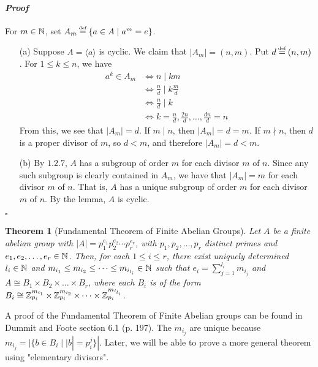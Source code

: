 \documentclass[11pt]{book}
\newcounter{counter}
\newtheorem{theorem}[counter]{Theorem}   \newtheorem*{theorem*}{Theorem}   \newtheorem{lemma}[counter]{Lemma}   \newtheorem{corollary}[counter]{Corollary}
\theoremstyle{definition}   \newtheorem{defn}[counter]{Definition} %
\newcommand\myeq{\mathrel{\overset{\makebox[0pt]{\mbox{\normalfont\tiny\sffamily \textrm{def}}}}{=}}}
\newcommand{\pf}[1]{$ #1 = p_1^{e_1} p_2^{e_2} \cdots p_r^{e_r}$, with $p_1,p_2,\dots,p_r$ distinct primes and $e_1,e_2,\dots,e_r\in \N$}
\newcommand{\gen}[1]{\langle #1 \rangle}   \newcommand{\stab}[2]{\tn{Stab}_{#1}(#2)}   \newcommand{\fix}[2]{\tn{Fix}_{#1}(#2)}
\newenvironment{prf}{\paragraph{\textit{Proof}}}{\hfill$\square$}
\newcommand{\vs}{\vspace{8pt}}
\numberwithin{counter}{chapter}
\begin{document}
\begin{prf}
For $m \in \operatorname{\mathbb{N}}$, set $A_m \myeq \{a \in A \mid a^m = e\}$.
	\begin{enumerate}
	\item[(a)] Suppose $A = \gen{a}$ is cyclic. We claim that $|A_m| = (n,m)$. Put $d \myeq (n,m)$. For $1 \leq k \leq n$, we have
		\begin{align*}
		a^k \in A_m &\iff n \mid km \\
		&\iff \frac{n}{d} \mid k \frac{m}{d} \\
		&\iff \frac{n}{d} \mid k \\
		&\iff k = \frac{n}{d}, \frac{2n}{d}, \dots, \frac{dn}{d} = n
		\end{align*}
	From this, we see that $|A_m| = d$. If $m \mid n$, then $|A_m| = d = m$. If $m \nmid n$, then $d$ is a proper divisor of $m$, so $d < m$, and therefore $|A_m| = d < m$.

	\item[(b)] By $1.2.7$, $A$ has a subgroup of order $m$ for each divisor $m$ of $n$. Since any such subgroup is clearly contained in $A_m$, we have that $|A_m| = m$ for each divisor $m$ of $n$. That is, $A$ has a unique subgroup of order $m$ for each divisor $m$ of $n$. By the lemma, $A$ is cyclic.
	\end{enumerate}
\end{prf}

\vs

\begin{theorem}[Fundamental Theorem of Finite Abelian Groups]
Let $A$ be a finite abelian group with \pf{|A|}. Then, for each $1 \leq i \leq r$, there exist uniquely determined $l_i \in \operatorname{\mathbb{N}}$ and $m_{i_1} \leq m_{i_2} \leq \dots \leq m_{i_{l_i}} \in \operatorname{\mathbb{N}}$ such that $e_i = \sum_{j=1}^{l_i} m_{i_j}$ and $A \cong B_1 \times B_2 \times \dots \times B_r$, where each $B_i$ is of the form $B_i \cong \operatorname{\mathbb{Z}}_{p_i}^{m_{i_1}} \times \operatorname{\mathbb{Z}}_{p_i}^{m_{i_2}} \times \dots \times \operatorname{\mathbb{Z}}_{p_i}^{m_{i_{l_i}}}$.
\end{theorem}

\vs

\begin{remark*}
A proof of the Fundamental Theorem of Finite Abelian groups can be found in Dummit and Foote section 6.1 (p. 197). The $m_{i_j}$ are unique because $m_{i_j} = |\{b \in B_i \mid |b| = p_i^j\}|$. Later, we will be able to prove a more general theorem using "elementary divisors".
\end{remark*}

\vs
\end{document}
